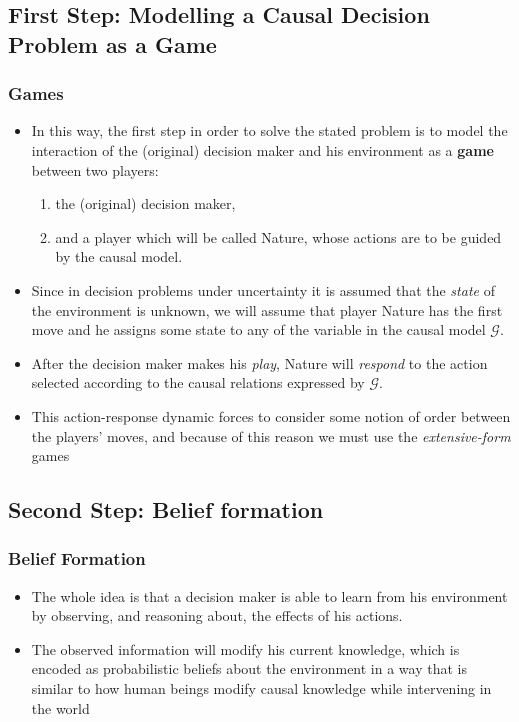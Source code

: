 \documentclass{beamer}
\theoremstyle{plain}
\begin{document}
\subsection{First Step: Modelling a Causal Decision Problem as a Game}
\begin{frame}
\frametitle{Games}
\begin{itemize}
\item In this way, the first step in order to solve the stated problem is to model the interaction of the (original) decision maker and his environment as a \textbf{game} between two players: 
\begin{enumerate}
\item the (original) decision maker, 
\item and a player which will be called Nature, whose actions are to be guided by the causal model.
\end{enumerate}
\end{itemize}
\end{frame}

\begin{frame}
\begin{itemize}
\item  Since in decision problems under uncertainty it is assumed that the \textit{state} of the environment is unknown, we will assume that player Nature has the first move and he assigns some state to any of the variable in the causal model $\mathcal{G}$.
\item After the decision maker makes his \textit{play}, Nature will \textit{respond} to the action selected according to the causal relations expressed by $\mathcal{G}$.
\item This action-response dynamic forces to consider some notion of order between the players' moves, and because of this reason we must use the \textit{extensive-form} games
\end{itemize}
\end{frame}

\subsection{Second Step: Belief formation}
\begin{frame}
\frametitle{Belief Formation}
\begin{itemize}
\item The whole idea is that a decision maker is able to learn from his environment by observing, and reasoning about, the effects of his actions.
\item The observed information will modify his current knowledge, which is encoded as probabilistic beliefs about the environment in a way that is similar to how human beings modify causal knowledge while intervening in the world
\end{itemize}
\end{frame}
\end{document}
